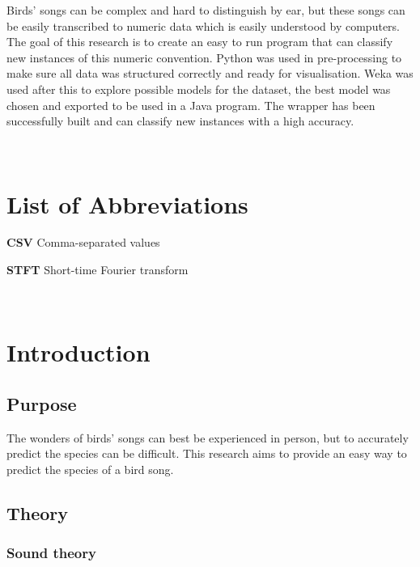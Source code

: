 \documentclass[
]{article}
\begin{document}
Birds' songs can be complex and hard to distinguish by ear, but these songs can be easily transcribed to numeric data which is easily understood by computers.
The goal of this research is to create an easy to run program that can classify new instances of this numeric convention.
Python was used in pre-processing to make sure all data was structured correctly and ready for visualisation.
Weka was used after this to explore possible models for the dataset, the best model was chosen and exported to be used in a Java program.
The wrapper has been successfully built and can classify new instances with a high accuracy.

\label{sec:summ}~
\newpage

\section*{List of Abbreviations}

\textbf{CSV} Comma-separated values

\textbf{STFT} Short-time Fourier transform

\label{sec:abvs}~

\newpage

{
\setcounter{tocdepth}{2}
\tableofcontents
}
\newpage


\hypertarget{introduction}{%
\section{Introduction}\label{introduction}}

\hypertarget{purpose}{%
\subsection{Purpose}\label{purpose}}

The wonders of birds' songs can best be experienced in person, but to
accurately predict the species can be difficult. This research aims to
provide an easy way to predict the species of a bird song.

\hypertarget{theory}{%
\subsection{Theory}\label{theory}}

\hypertarget{sound-theory}{%
\subsubsection{Sound theory}\label{sound-theory}}
\end{document}
